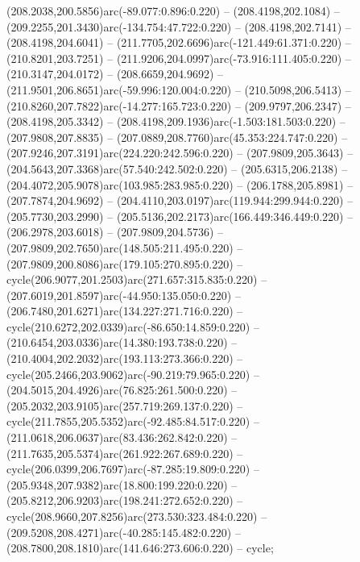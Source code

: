 \begin{scope}[cm={{1.25,0.0,0.0,-1.25,(0.0,442.91375)}}]
    (208.2038,200.5856)arc(-89.077:0.896:0.220) -- (208.4198,202.1084) --
    (209.2255,201.3430)arc(-134.754:47.722:0.220) -- (208.4198,202.7141) --
    (208.4198,204.6041) -- (211.7705,202.6696)arc(-121.449:61.371:0.220) --
    (210.8201,203.7251) -- (211.9206,204.0997)arc(-73.916:111.405:0.220) --
    (210.3147,204.0172) -- (208.6659,204.9692) --
    (211.9501,206.8651)arc(-59.996:120.004:0.220) -- (210.5098,206.5413) --
    (210.8260,207.7822)arc(-14.277:165.723:0.220) -- (209.9797,206.2347) --
    (208.4198,205.3342) -- (208.4198,209.1936)arc(-1.503:181.503:0.220) --
    (207.9808,207.8835) -- (207.0889,208.7760)arc(45.353:224.747:0.220) --
    (207.9246,207.3191)arc(224.220:242.596:0.220) -- (207.9809,205.3643) --
    (204.5643,207.3368)arc(57.540:242.502:0.220) -- (205.6315,206.2138) --
    (204.4072,205.9078)arc(103.985:283.985:0.220) -- (206.1788,205.8981) --
    (207.7874,204.9692) -- (204.4110,203.0197)arc(119.944:299.944:0.220) --
    (205.7730,203.2990) -- (205.5136,202.2173)arc(166.449:346.449:0.220) --
    (206.2978,203.6018) -- (207.9809,204.5736) --
    (207.9809,202.7650)arc(148.505:211.495:0.220) --
    (207.9809,200.8086)arc(179.105:270.895:0.220) --
    cycle(206.9077,201.2503)arc(271.657:315.835:0.220) --
    (207.6019,201.8597)arc(-44.950:135.050:0.220) --
    (206.7480,201.6271)arc(134.227:271.716:0.220) --
    cycle(210.6272,202.0339)arc(-86.650:14.859:0.220) --
    (210.6454,203.0336)arc(14.380:193.738:0.220) --
    (210.4004,202.2032)arc(193.113:273.366:0.220) --
    cycle(205.2466,203.9062)arc(-90.219:79.965:0.220) --
    (204.5015,204.4926)arc(76.825:261.500:0.220) --
    (205.2032,203.9105)arc(257.719:269.137:0.220) --
    cycle(211.7855,205.5352)arc(-92.485:84.517:0.220) --
    (211.0618,206.0637)arc(83.436:262.842:0.220) --
    (211.7635,205.5374)arc(261.922:267.689:0.220) --
    cycle(206.0399,206.7697)arc(-87.285:19.809:0.220) --
    (205.9348,207.9382)arc(18.800:199.220:0.220) --
    (205.8212,206.9203)arc(198.241:272.652:0.220) --
    cycle(208.9660,207.8256)arc(273.530:323.484:0.220) --
    (209.5208,208.4271)arc(-40.285:145.482:0.220) --
    (208.7800,208.1810)arc(141.646:273.606:0.220) -- cycle;
\end{scope}